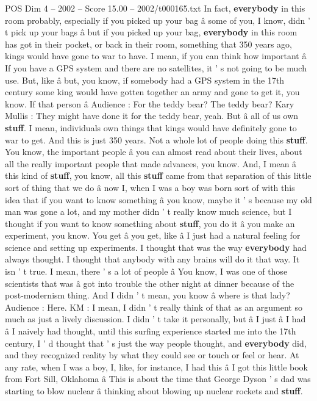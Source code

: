 \begin{textsample}{POS Dim 4 – 2002 – Score 15.00 – 2002/t000165.txt}
In fact, \textbf{everybody} in this room probably, especially if you picked up your bag â some of you, I know, didn ' t pick up your bags â but if you picked up your bag, \textbf{everybody} in this room has got in their pocket, or back in their room, something that 350 years ago, kings would have gone to war to have.
I mean, if you can think how important â If you have a GPS system and there are no satellites, it ' s not going to be much use.
But, like â but, you know, if somebody had a GPS system in the 17th century some king would have gotten together an army and gone to get it, you know.
If that person â Audience : For the teddy bear?
The teddy bear?
Kary Mullis : They might have done it for the teddy bear, yeah.
But â all of us own \textbf{stuff}.
I mean, individuals own things that kings would have definitely gone to war to get.
And this is just 350 years.
Not a whole lot of people doing this \textbf{stuff}.
You know, the important people â you can almost read about their lives, about all the really important people that made advances, you know.
And, I mean â this kind of \textbf{stuff}, you know, all this \textbf{stuff} came from that separation of this little sort of thing that we do â now I, when I was a boy was born sort of with this idea that if you want to know something â you know, maybe it ' s because my old man was gone a lot, and my mother didn ' t really know much science, but I thought if you want to know something about \textbf{stuff}, you do it â you make an experiment, you know.
You get â you get, like â I just had a natural feeling for science and setting up experiments.
I thought that was the way \textbf{everybody} had always thought.
I thought that anybody with any brains will do it that way.
It isn ' t true.
I mean, there ' s a lot of people â You know, I was one of those scientists that was â got into trouble the other night at dinner because of the post-modernism thing.
And I didn ' t mean, you know â where is that lady?
Audience : Here.
KM : I mean, I didn ' t really think of that as an argument so much as just a lively discussion.
I didn ' t take it personally, but â I just â I had â I naively had thought, until this surfing experience started me into the 17th century, I ' d thought that ' s just the way people thought, and \textbf{everybody} did, and they recognized reality by what they could see or touch or feel or hear.
At any rate, when I was a boy, I, like, for instance, I had this â I got this little book from Fort Sill, Oklahoma â This is about the time that George Dyson ' s dad was starting to blow nuclear â thinking about blowing up nuclear rockets and \textbf{stuff}.

\end{textsample}
